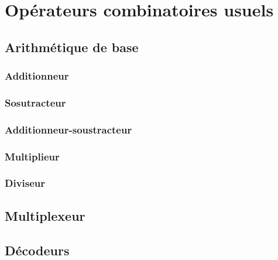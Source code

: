 \chapter{Opérateurs combinatoires usuels}
\minitoc

\section{Arithmétique de base}
\subsection{Additionneur}
\subsection{Sosutracteur}
\subsection{Additionneur-soustracteur}
\subsection{Multiplieur}
\subsection{Diviseur}

\section{Multiplexeur}

\section{Décodeurs}
